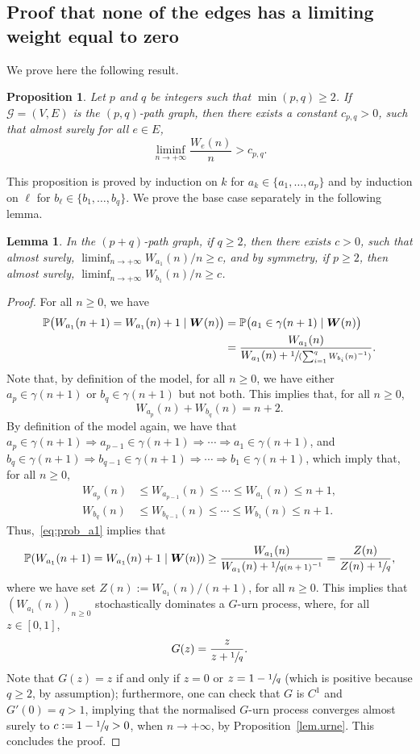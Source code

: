 \documentclass[11pt]{article}
\newcommand{\Subsection}{\subsection}
\let\mathcal\mathscr
\let \nicefrac\sfrac
\newcommand{\spfrac}[2]{\sfrac{#1}{(#2)}}
\newcommand{\bW}{\boldsymbol{W}}
\numberwithin{equation}{section}
\newtheorem{lemma}[theorem]{Lemma}
\newtheorem{proposition}[theorem]{Proposition}
\theoremstyle{definition}
\begin{document}
\Subsection{Proof that none of the edges has a limiting weight equal to zero}\label{subsec.2paths.1}
We prove here the following result.

\begin{proposition}\label{prop:multiedges}
Let $p$ and $q$ be integers such that $\min(p, q)\geq 2$.
If $\mathcal G = (V,E)$ is the $(p,q)$-path graph, then there exists a constant $c_{p,q}>0$, such that almost surely for all $e\in E$,
\[
\liminf_{n\to +\infty} \frac{W_e(n)}n> c_{p,q}.
\]
\end{proposition}
This proposition is proved by induction on $k$ for $a_k\in \{a_1, \ldots, a_p\}$ and by induction on $\ell$ for $b_\ell\in \{b_1, \ldots, b_q\}$. We prove the base case separately in the following lemma.
\begin{lemma}\label{lem:liminf_a1}
In the $(p+q)$-path graph, if $q\geq 2$, then there exists $c>0$, such that almost surely, $\liminf_{n\to+\infty} W_{a_1}(n)/n\ge c$, and by symmetry, if $p\geq 2$, then almost surely, $\liminf_{n\to+\infty} W_{b_1}(n)/n\ge c$.
\end{lemma}

\begin{proof}
For all $n\geq 0$, we have
\begin{equation}
\begin{aligned}\label{eq:prob_a1}
\mathbb P\bigl(W_{a_1}(n+1) = W_{a_1}(n)+1 \mid \bW(n)\bigr)
&=\mathbb P\bigl(a_1 \in \gamma(n+1)\mid \bW(n)\bigr)\\
&= \frac{W_{a_1}(n)}{W_{a_1}(n)+
\spfrac{1}{\sum_{i=1}^q W_{b_i}(n)^{-1}}}.
\end{aligned}
\end{equation}
Note that, by definition of the model,
for all $n\geq 0$,
we have either $a_p\in\gamma(n+1)$ or $b_q\in\gamma(n+1)$ but not both.
This implies that, for all $n\geq 0$,
\[
W_{a_p}(n)+W_{b_q}(n)=n+2.
\]
By definition of the model again,
we have that $a_p\in\gamma(n+1)\Rightarrow a_{p-1}\in \gamma(n+1) \Rightarrow \cdots \Rightarrow a_1\in\gamma(n+1)$, and
$b_q\in\gamma(n+1)\Rightarrow b_{q-1}\in\gamma(n+1)\Rightarrow \cdots \Rightarrow b_1\in\gamma(n+1)$, which imply that, for all $n\geq 0$,
\begin{align*}
W_{a_p}(n)&\leq W_{a_{p-1}}(n)\leq \cdots \leq W_{a_1}(n)\leq n+1,\\
\tag*{and}
W_{b_q}(n)&\leq W_{b_{q-1}}(n)\leq\cdots \leq W_{b_1}(n)\leq n+1.
\end{align*}
Thus,~\eqref{eq:prob_a1} implies that
\[
\mathbb P(W_{a_1}(n+1) = W_{a_1}(n)+1 \mid \bW(n))
\geq \frac{W_{a_1}(n)}{W_{a_1}(n)+\sfrac{1}{q(n+1)^{-1}}}
=\frac{Z(n)}{Z(n)+\nicefrac 1q},
\]
where we have set $Z(n):=W_{a_1}(n)/(n+1)$, for all $n\geq 0$.
This implies that $(W_{a_1}(n))_{n\ge 0}$ stochastically dominates a $G$-urn process,
where, for all $z\in[0,1]$,
\[
G(z) = \frac{z}{z+\nicefrac1{q}}.
\]
Note that $G(z) = z$ if and only if $z=0$ or $z=1-{\nicefrac1q}$
(which is positive because $q\geq 2$, by assumption);
furthermore, one can check that $G$ is $C^1$ and $G'(0) = q > 1$,
implying that the normalised $G$-urn process converges almost surely to $c:= 1-\nicefrac1q>0$, when $n\to+\infty$, by Proposition~\ref{lem.urne}.
This concludes the proof.
\end{proof}
\end{document}

